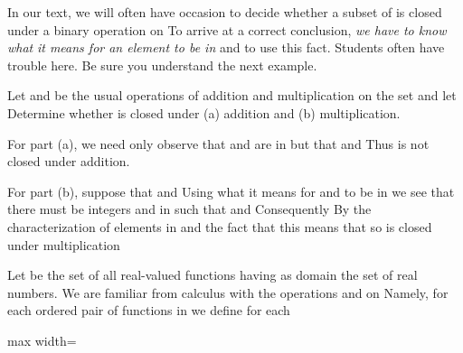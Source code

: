 \documentclass[11pt,oneside]{article}
\begin{document}
\begin{BookBody}
In our text, we will often have occasion to decide whether a subset  of  is closed under a binary operation \BookInline{\ast } on  To arrive at a correct conclusion,\textit{ we have to know what} \textit{it means for an element to be in}  and to use this fact. Students often have trouble here. Be sure you understand the next example.

 Let \BookInline{+ } and \BookInline{\cdot } be the usual operations of addition and multiplication on the set  and let  Determine whether  is closed under (a) addition and (b) multiplication.

For part (a), we need only observe that  and  are in  but that  and  Thus  is not closed under addition.

For part (b), suppose that  and  Using what it means for  and  to be in  we see that there must be integers  and  in  such that  and  Consequently By the characterization of elements in  and the fact that  this means that  so  is closed under multiplication\BookEnd{\blacktriangle}

 Let  be the set of all real-valued functions  having as domain the set  of real numbers. We are familiar from calculus with the operations \BookInline{+,\allowbreak -,\allowbreak \cdot,\allowbreak } and \BookInline{\circ } on  Namely, for each ordered pair  of functions in  we define for each 

\begin{center}\begin{adjustbox}{max width=\linewidth}\end{adjustbox}\end{center}


\end{BookBody}
\end{document}
